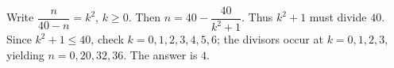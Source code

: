 Write $\dfrac{n}{40-n}=k^2$, $k\ge0$. Then $n=40-\dfrac{40}{k^2+1}$. Thus $k^2+1$ must divide $40$. Since $k^2+1\le40$, check $k=0,1,2,3,4,5,6$; the divisors occur at $k=0,1,2,3$, yielding $n=0,20,32,36$. The answer is $\boxed4$.
